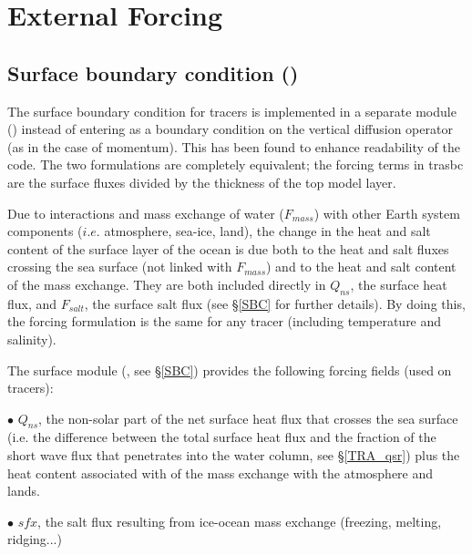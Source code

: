 \documentclass[NEMO_book]{subfiles}
\begin{document}
\section{External Forcing}
\label{TRA_sbc_qsr_bbc}

\subsection   [Surface boundary condition (\textit{trasbc})]
			{Surface boundary condition ()}
\label{TRA_sbc}

The surface boundary condition for tracers is implemented in a separate 
module () instead of entering as a boundary condition on the vertical 
diffusion operator (as in the case of momentum). This has been found to 
enhance readability of the code. The two formulations are completely 
equivalent; the forcing terms in trasbc are the surface fluxes divided by 
the thickness of the top model layer. 

Due to interactions and mass exchange of water ($F_{mass}$) with other Earth system components 
($i.e.$ atmosphere, sea-ice, land), the change in the heat and salt content of the surface layer 
of the ocean is due both to the heat and salt fluxes crossing the sea surface (not linked with $F_{mass}$) 
and to the heat and salt content of the mass exchange. They are both included directly in $Q_{ns}$, 
the surface heat flux, and $F_{salt}$, the surface salt flux (see \S\ref{SBC} for further details).
By doing this, the forcing formulation is the same for any tracer (including temperature and salinity).

The surface module (, see \S\ref{SBC}) provides the following 
forcing fields (used on tracers):

$\bullet$ $Q_{ns}$, the non-solar part of the net surface heat flux that crosses the sea surface 
(i.e. the difference between the total surface heat flux and the fraction of the short wave flux that 
penetrates into the water column, see \S\ref{TRA_qsr}) plus the heat content associated with 
of the mass exchange with the atmosphere and lands.

$\bullet$ $\textit{sfx}$, the salt flux resulting from ice-ocean mass exchange (freezing, melting, ridging...)
\end{document}
